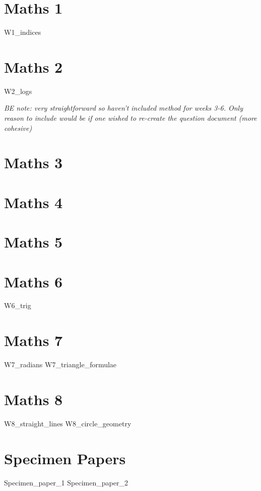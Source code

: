 \documentclass[12pt]{exam}
\begin{document}
\tableofcontents
\newpage

\section{Maths 1}
{W1_indices}

\newpage
\section{Maths 2}
{W2_logs}

\newpage
\textit{BE note: very straightforward so haven't included method for weeks 3-6.
Only reason to include would be if one wished to re-create the question 
document (more cohesive)}
\section{Maths 3}
\section{Maths 4}
\section{Maths 5}
\section{Maths 6}
{W6_trig}

\newpage
\section{Maths 7}
{W7_radians}
\newpage
{W7_triangle_formulae}

\newpage
\section{Maths 8}
{W8_straight_lines}
\newpage
{W8_circle_geometry}

\newpage
\section{Specimen Papers}
{Specimen_paper_1}
\newpage
{Specimen_paper_2}
\end{document}
